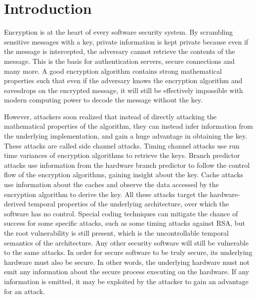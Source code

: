 \documentclass[times, 10pt,twocolumn]{article}
\begin{document}
\section{Introduction}
Encryption is at the heart of every software security system. By scrambling sensitive messages with a key, private information is kept private because even if the message is intercepted, the adversary cannot retrieve the contents of the message. This is the basis for authentication servers, secure connections and many more. A good encryption algorithm contains strong mathematical properties such that even if the adversary knows the encryption algorithm and eavesdrops on the encrypted message, it will still be effectively impossible with modern computing power to decode the message without the key.

However, attackers soon realized that instead of directly attacking the mathematical properties of the algorithm, they can instead infer information from the underlying implementation, and gain a huge advantage in obtaining the key. These attacks are called side channel attacks. Timing channel attacks use run time variances of encryption algorithms to retrieve the keys. Branch predictor attacks use information from the hardware branch predictor to follow the control flow of the encryption algorithms, gaining insight about the key. Cache attacks use information about the caches and observe the data accessed by the encryption algorithm to derive the key. All these attacks target the hardware-derived temporal properties of the underlying architecture, over which the software has no control.  Special coding techniques can mitigate the chance of success for some specific attacks, such as some timing attacks against RSA, but the root vulnerability is still present, which is the uncontrollable temporal semantics of the architecture. Any other security software will still be vulnerable to the same attacks. In order for secure software to be truly secure, its underlying hardware must also be secure. In other words, the underlying hardware must not emit any information about the secure process executing on the hardware. If any information is emitted, it may be exploited by the attacker to gain an advantage for an attack.
\end{document}
